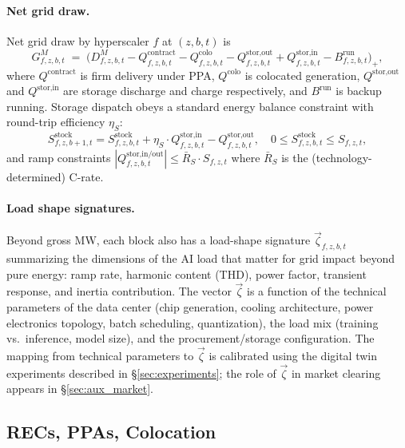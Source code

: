 \documentclass[12pt,letterpaper]{article}
\begin{document}
\paragraph{Net grid draw.} Net grid draw by hyperscaler $f$ at $(z,b,t)$ is
\begin{equation}
\label{eq:grid_draw}
G^M_{f,z,b,t} \;=\; \big( D^M_{f,z,b,t}
- Q^{\text{contract}}_{f,z,b,t}
- Q^{\text{colo}}_{f,z,b,t}
- Q^{\text{stor,out}}_{f,z,b,t}
+ Q^{\text{stor,in}}_{f,z,b,t}
- B^{\text{run}}_{f,z,b,t} \big)_+,
\end{equation}
where $Q^{\text{contract}}$ is firm delivery under PPA, $Q^{\text{colo}}$ is
colocated generation, $Q^{\text{stor,out}}$ and $Q^{\text{stor,in}}$ are
storage discharge and charge respectively, and $B^{\text{run}}$ is backup
running. Storage dispatch obeys a standard energy balance constraint with
round-trip efficiency $\eta_S$:
\begin{equation}
\label{eq:storage_balance}
S^{\text{stock}}_{f,z,b+1,t} = S^{\text{stock}}_{f,z,b,t} + \eta_S \cdot
Q^{\text{stor,in}}_{f,z,b,t} - Q^{\text{stor,out}}_{f,z,b,t}, \quad
0 \leq S^{\text{stock}}_{f,z,b,t} \leq S_{f,z,t},
\end{equation}
and ramp constraints $|Q^{\text{stor,in/out}}_{f,z,b,t}| \leq \bar R_S \cdot
S_{f,z,t}$ where $\bar R_S$ is the (technology-determined) C-rate.

\paragraph{Load shape signatures.} Beyond gross MW, each block also has a
load-shape signature $\vec\zeta_{f,z,b,t}$ summarizing the dimensions of
the AI load that matter for grid impact beyond pure energy: ramp rate,
harmonic content (THD), power factor, transient response, and inertia
contribution. The vector $\vec\zeta$ is a function of the technical
parameters of the data center (chip generation, cooling architecture, power
electronics topology, batch scheduling, quantization), the load mix
(training vs.\ inference, model size), and the procurement/storage
configuration. The mapping from technical parameters to $\vec\zeta$ is
calibrated using the digital twin experiments described in
\S\ref{sec:experiments}; the role of $\vec\zeta$ in market clearing
appears in \S\ref{sec:aux_market}.

\subsection{RECs, PPAs, Colocation}
\label{sec:proc_costs}
\end{document}
